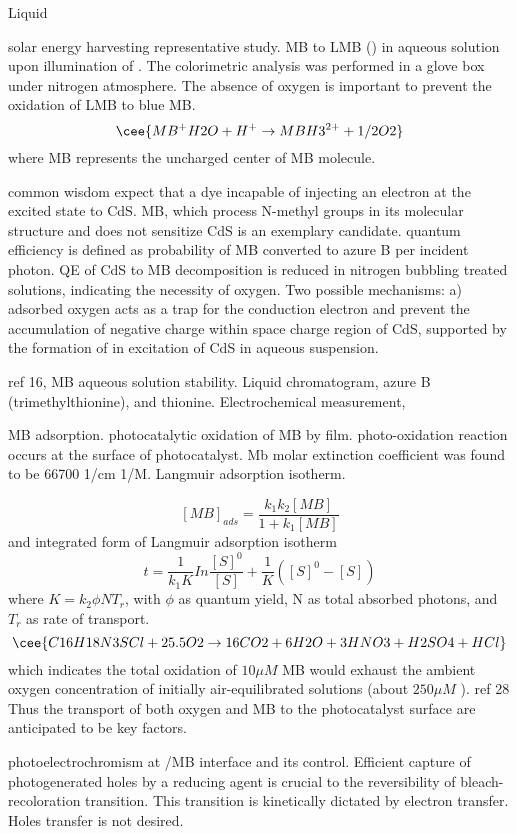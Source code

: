 Liquid

solar energy harvesting representative study.\cite{Yoneyama1972} MB to LMB () in aqueous solution upon illumination of . The colorimetric analysis was performed in a glove box under nitrogen atmosphere. The absence of oxygen is important to prevent the oxidation of LMB to blue MB.
\[
\cee{MB^+ H2O + H^+ \rightarrow MBH3^{2+} + 1/2O2}
\]
where MB represents the uncharged center of MB molecule.

common wisdom expect that a dye incapable of injecting an electron at the excited state to CdS. MB, which process N-methyl groups in its molecular structure and does not sensitize CdS is an exemplary candidate. quantum efficiency is defined as probability of MB converted to azure B per incident photon. QE of CdS to MB decomposition is reduced in nitrogen bubbling treated solutions, indicating the necessity of oxygen. Two possible mechanisms: a) adsorbed oxygen acts as a trap for the conduction electron and prevent the accumulation of negative charge within space charge region of CdS, supported by the formation of  in excitation of CdS in aqueous suspension.\cite{Takizawa1978}

ref 16, MB aqueous solution stability. Liquid chromatogram, azure B (trimethylthionine), and thionine. Electrochemical measurement,

MB adsorption.  photocatalytic oxidation of MB by  film. photo-oxidation reaction occurs at the surface of photocatalyst. Mb molar extinction coefficient was found to be 66700 1/cm 1/M. Langmuir adsorption isotherm.\cite{Matthews1989}

\[
[MB]_{ads} = \frac{k_1 k_2 [MB]}{1 + k_1[MB]}
\]
and integrated form of Langmuir adsorption isotherm
\[
t = \frac{1}{k_1K} In\frac{[S]^0}{[S]} + \frac{1}{K}([S]^0 - [S])
\]
where $K = k_2 \phi N T_r$, with $\phi$ as quantum yield, N as total absorbed photons, and $T_r$ as rate of transport.
\[
\cee{C16H18N3SCl + 25.5O2 \rightarrow 16CO2 + 6H2O + 3HNO3 + H2SO4 +HCl}
\]
which indicates the total oxidation of $10 \mu M$ MB would exhaust the ambient oxygen concentration of initially air-equilibrated solutions (about $250 \mu M$ ). ref 28 Thus the transport of both oxygen and MB to the photocatalyst surface are anticipated to be key factors.

photoelectrochromism at /MB interface and its control. Efficient capture of photogenerated holes by a reducing agent is crucial to the reversibility of bleach-recoloration transition. This transition is kinetically dictated by electron transfer. Holes transfer is not desired.\cite{DeTacconi1997}

